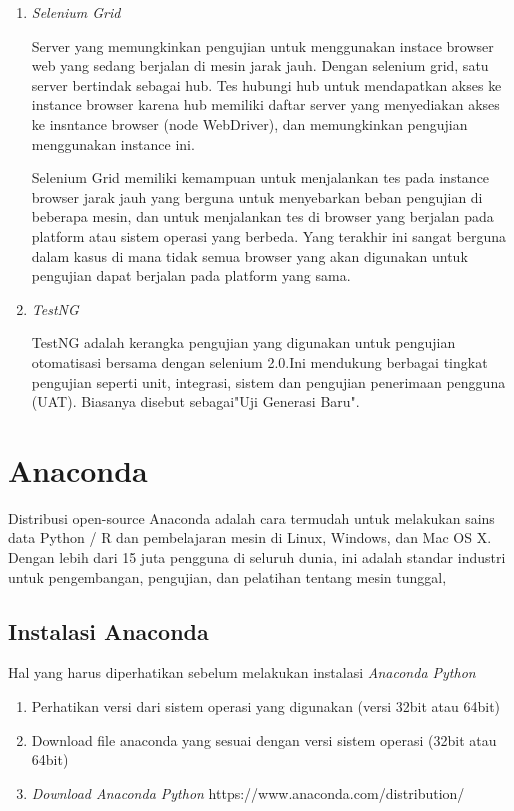 \begin{enumerate}
\item \textit{Selenium Grid}
\par Server yang memungkinkan pengujian untuk menggunakan instace browser web yang sedang berjalan di mesin jarak jauh. Dengan selenium grid, satu server bertindak sebagai hub. Tes hubungi hub untuk mendapatkan akses ke instance browser karena hub memiliki daftar server yang menyediakan akses ke insntance browser (node WebDriver), dan memungkinkan pengujian menggunakan instance ini. 
\par Selenium Grid memiliki kemampuan untuk menjalankan tes pada instance browser jarak jauh yang berguna untuk menyebarkan beban pengujian di beberapa mesin, dan untuk menjalankan tes di browser yang berjalan pada platform atau sistem operasi yang berbeda. Yang terakhir ini sangat berguna dalam kasus di mana tidak semua browser yang akan digunakan untuk pengujian dapat berjalan pada platform yang sama.

\item \textit{TestNG} 
\par TestNG adalah kerangka pengujian yang digunakan untuk pengujian otomatisasi bersama dengan selenium 2.0.Ini mendukung berbagai tingkat pengujian seperti unit, integrasi, sistem dan pengujian penerimaan pengguna (UAT). Biasanya disebut sebagai"Uji Generasi Baru".
\end{enumerate}

\section{Anaconda}
Distribusi open-source Anaconda adalah cara termudah untuk melakukan sains data Python / R dan pembelajaran mesin di Linux, Windows, dan Mac OS X. Dengan lebih dari 15 juta pengguna di seluruh dunia, ini adalah standar industri untuk pengembangan, pengujian, dan pelatihan tentang mesin tunggal,

\subsection{Instalasi Anaconda}
Hal yang harus diperhatikan sebelum melakukan instalasi \textit{Anaconda Python}
\begin{enumerate}
 \item Perhatikan versi dari sistem operasi yang digunakan (versi 32bit atau 64bit)
 \item Download file anaconda yang sesuai dengan versi sistem operasi (32bit atau 64bit)
 \item \textit{Download Anaconda Python} https://www.anaconda.com/distribution/
\end{enumerate}

